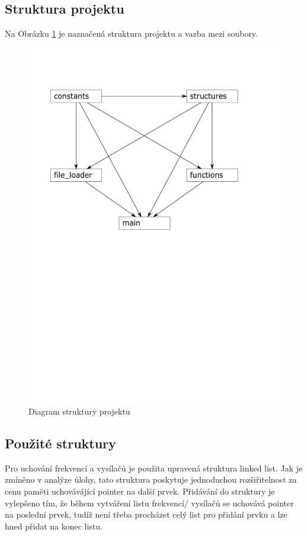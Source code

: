 \documentclass[12pt]{article}
\begin{document}
\subsection{Struktura projektu}
%
Na Obrázku \ref{img:structure} je naznačená struktura projektu a vazba mezi soubory.
%
\begin{figure}[H]
        \centering
        \includegraphics[width=\textwidth, trim={0 14cm 0 0}]{img/project_diagram.pdf}
        \caption{Diagram struktury projektu}
        \label{img:structure}
\end{figure}
%
\subsection{Použité struktury}
%
Pro uchování frekvencí a vysílačů je použita upravená struktura linked list.
Jak je zmíněno v analýze úlohy, tato struktura poskytuje jednoduchou
rozšiřitelnost za cenu paměti uchovávájící pointer na další prvek. Přidávání
do struktury 
je vylepšeno tím, že během vytváření listu frekvencí/ vysílačů se uchovává 
pointer na poslední prvek, tudíž není třeba procházet celý list pro přidání
prvku a lze hned přidat na konec listu.\\
\end{document}
